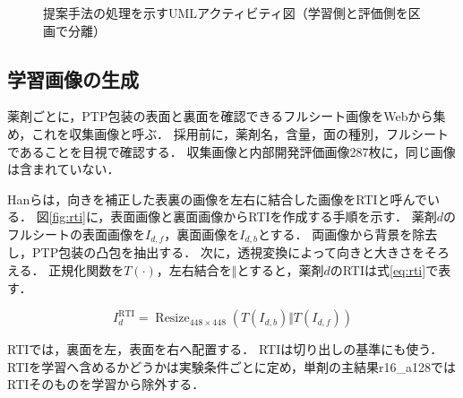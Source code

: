 \documentclass[uplatex,dvipdfmx]{jsarticle}
\begin{document}
\begin{figure}[htbp]
  \caption{提案手法の処理を示すUMLアクティビティ図（学習側と評価側を区画で分離）}
  \label{fig:pipeline}
\end{figure}

\subsection{学習画像の生成}

薬剤ごとに，PTP包装の表面と裏面を確認できるフルシート画像をWebから集め，これを収集画像と呼ぶ．
採用前に，薬剤名，含量，面の種別，フルシートであることを目視で確認する．
収集画像と内部開発評価画像287枚に，同じ画像は含まれていない．

Hanらは，向きを補正した表裏の画像を左右に結合した画像をRTIと呼んでいる\cite{han2021blister}．
図\ref{fig:rti}に，表面画像と裏面画像からRTIを作成する手順を示す．
薬剤$d$のフルシートの表面画像を$I_{d,f}$，裏面画像を$I_{d,b}$とする．
両画像から背景を除去し，PTP包装の凸包を抽出する．
次に，透視変換によって向きと大きさをそろえる．
正規化関数を$T(\cdot)$，左右結合を$\Vert$とすると，薬剤$d$のRTIは式\eqref{eq:rti}で表す．

\begin{equation}
  I^{\mathrm{RTI}}_d =
  \operatorname{Resize}_{448 \times 448}
  \left(T(I_{d,b}) \Vert T(I_{d,f})\right)
  \label{eq:rti}
\end{equation}

RTIでは，裏面を左，表面を右へ配置する．
RTIは切り出しの基準にも使う．
RTIを学習へ含めるかどうかは実験条件ごとに定め，単剤の主結果r16\_a128ではRTIそのものを学習から除外する．
\end{document}
